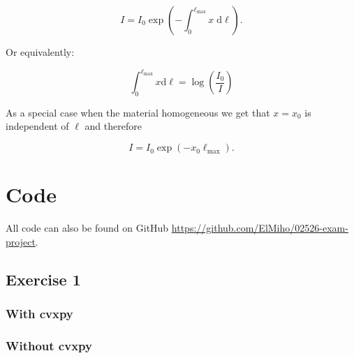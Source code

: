 \documentclass{article}
\begin{document}
\begin{equation}
    I = I_0 \exp{\left(-\int_{0}^{\ell_{\max}} x \; \mathrm{d}\ell \right)}.
\end{equation}

Or equivalently:

\begin{equation}
    \int_{0}^{\ell_{\max}}x \text{d} \ell = \log\left(\frac{I_0}{I}\right)
\end{equation}

As a special case when the material homogeneous we get that $x = x_0$ is independent of $\ell$ and therefore

\begin{equation}
    I = I_0 \exp{(-x_0 \ell_{\max})}.
\end{equation}



\section{Code}
All code can also be found on GitHub \url{https://github.com/ElMiho/02526-exam-project}. 

\subsection{Exercise 1}
\subsubsection{With cvxpy}\label{appendix:exercise-1-cvxpy}


\subsubsection{Without cvxpy}\label{appendix:exercise-1}

\end{document}

